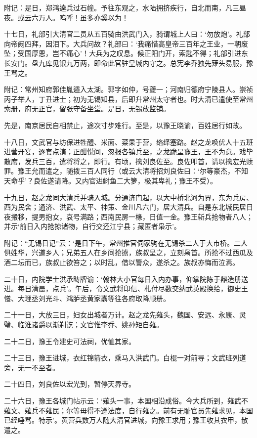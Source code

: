 \documentclass[]{article}
\begin{document}
附记：是日，郑鸿逵兵过石幢。予往东观之，水陆拥挤疾行，自北而南，凡三昼夜。或云六万人。呜呼！虽多亦奚以为！

十七日，礼部引大清官二员从五百骑由洪武门入，骑谓城上人曰：`勿放炮'。礼部向帝阙四拜，因泪下。大兵问故？礼部曰：`我痛惜高皇帝三百年之王业，一朝废坠；受国厚恩，岂不痛心'！大兵为之叹息。候正阳门开，索匙不得；礼部引进东长安门。盘九库见银九万两，即命此官驻皇城内守之。总宪李乔独先薙头易服，豫王骂之。

附记：常州知府郭佳胤遁入太湖。郭字如仲，号夔一；河南归德府宁陵县人。崇祯丙子举人，丁丑进士；初为无锡知县，后即升常州太守者也。时大清已遣使至常州索册，府无正官，留张守备坐堂。是日，无锡放监铺。

先是，南京居民自相禁止，途次寸步难行。至是，以豫王晓谕，百姓居行如故。

十八日，文武官与坊保进牲醴、米面、菜果于营，络绎塞路。赵之龙唤优人十五班进营开宴，逐套点演；正酣悦间，忽报各镇兵至，之龙跪呈豫王，王不为意。戏毕散席，发兵三百，遣将将之，即行。有顷，擒刘良佐至。良佐叩首，请以擒宏光赎罪。豫王允而遣之，随拨三百人同行（或云大清将招刘良佐曰：`尔等豪杰，不知天命乎'？良佐遂请降。又内官进鲥鱼二大箩，极其卑礼；豫王不受）。

十九日，赵之龙同大清兵并骑入城。分通济门起，以大中桥北河为界，东为兵房、西为民舍；通济、洪武、太平、神策、金川凡六门，居大清兵。自是东北城民居日夜搬移，提男抱女，哀号满路；西南民房一椽，日值一金。豫王斩兵抢物者八人；并示`前日入内抢掠诸物，自行交还江宁县；藏匿者枭示'。

附记：``无锡日记''云：`是日下午，常州推官伺家驹在无锡杀二人于大市桥。二人俱姓华，兴道乡人；兄弟五人在乡间抢掳，族叔呈之，立刻枭首。所抢不过西瓜及酒二坛而已，族叔止欲笞之；以时乱，借以警众，遂杀之。族叔亦悔而泣焉。

二十日，内院学士洪承畴牌谕：`翰林大小官每日入内办事，仰掌院陈于鼎造册送进。每日清晨，点兵'。午后，令文武将印信、札付尽数交纳武英殿换给，御史王懩、大理丞刘光斗、鸿胪丞黄家鼒等往各府取降顺册。

二十一日，大放三日，妇女出城者万计。赵之龙先薙头，魏国、安远、永康、灵璧、临淮诸爵以渐剃讫；文官惟李乔、姚孙矩自薙。

二十二日，豫王令建史可法祠，优恤其家。

二十三日，豫王进城，衣红锦箭衣，乘马入洪武门。白棍一对前导；文武班列道旁，无一不至者。

二十四日，刘良佐以宏光到，暂停天界寺。

二十六日，豫王各城门帖示云：`薙头一事，本国相沿成俗。今大兵所到，薙武不薙文、薙兵不薙民；尔等毋得不遵法度，自行薙之。前有无耻官员先薙求见，本国已经唾骂。特示'。黄营兵数万人随大清官进城，向豫王求用；豫王收其衣甲，散遣之。
\end{document}
